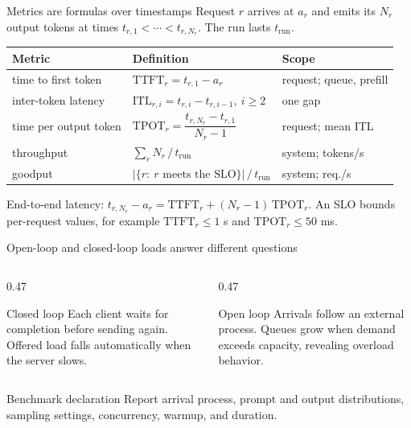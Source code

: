 \documentclass[handout]{beamer}
\begin{document}
\begin{frame}{Metrics are formulas over timestamps}
  \small
  Request $r$ arrives at $a_r$ and emits its $N_r$ output tokens at times $t_{r,1}<\cdots<t_{r,N_r}$. The run lasts $t_{\text{run}}$.
  \begin{center}
    \renewcommand{\arraystretch}{1.45}
    \begin{tabular}{@{}lll@{}}
      \toprule
      Metric & Definition & Scope \\
      \midrule
      time to first token & $\mathrm{TTFT}_r=t_{r,1}-a_r$ & request; queue, prefill \\
      inter-token latency & $\mathrm{ITL}_{r,i}=t_{r,i}-t_{r,i-1},\ i\ge 2$ & one gap \\
      time per output token & $\mathrm{TPOT}_r=\dfrac{t_{r,N_r}-t_{r,1}}{N_r-1}$ & request; mean ITL \\
      throughput & $\sum_r N_r\,/\,t_{\text{run}}$ & system; tokens/s \\
      goodput & $\bigl|\{r:\ \text{$r$ meets the SLO}\}\bigr|\,/\,t_{\text{run}}$ & system; req./s \\
      \bottomrule
    \end{tabular}
  \end{center}
  End-to-end latency: $t_{r,N_r}-a_r=\mathrm{TTFT}_r+(N_r-1)\,\mathrm{TPOT}_r$. An SLO bounds per-request values, for example $\mathrm{TTFT}_r\le 1$ s and $\mathrm{TPOT}_r\le 50$ ms.
\end{frame}

\begin{frame}{Open-loop and closed-loop loads answer different questions}
  \begin{columns}[t]
    \begin{column}{0.47\linewidth}
      \begin{block}{Closed loop}
        Each client waits for completion before sending again. Offered load falls automatically when the server slows.
      \end{block}
    \end{column}
    \begin{column}{0.47\linewidth}
      \begin{block}{Open loop}
        Arrivals follow an external process. Queues grow when demand exceeds capacity, revealing overload behavior.
      \end{block}
    \end{column}
  \end{columns}
  \begin{alertblock}{Benchmark declaration}
    Report arrival process, prompt and output distributions, sampling settings, concurrency, warmup, and duration.
  \end{alertblock}
\end{frame}
\end{document}
